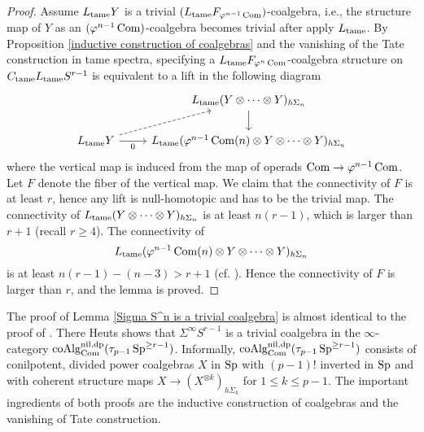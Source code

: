 \begin{proof}
	Assume $L_{\operatorname{\operatorname{tame}}} Y$ is a trivial $(L_{\operatorname{\operatorname{tame}}}F_{\varphi^{n-1} \operatorname{Com}})$-coalgebra, i.e., the structure map of $Y$ as an $(\varphi^{n-1} \operatorname{Com})$-coalgebra becomes trivial after apply $L_{\operatorname{\operatorname{tame}}}$.
	By Proposition \ref{inductive construction of coalgebras} and the vanishing of the Tate construction in tame spectra, specifying a $L_{\operatorname{\operatorname{tame}}}F_{\varphi^{n} \operatorname{Com}}$-coalgebra structure on $C_{\operatorname{\operatorname{tame}}}L_{\operatorname{\operatorname{tame}}}S^{r-1}$ is equivalent to a lift in the following diagram
		\[
	\begin{tikzcd}
		& L_{\tame}(Y \otimes \cdots \otimes Y)_{h\Sigma_n}\\
		 L_{\tame}Y & L_{\tame}(\varphi^{n-1}\Com(n)\otimes Y \otimes \cdots \otimes Y)_{h\Sigma_n}
		\arrow[from = 2-1, to = 1-2, dashed]
		\arrow[from = 2-1, to = 2-2, "0" below]
		\arrow[from = 1-2, to = 2-2]
	\end{tikzcd}
	\]
	where the vertical map is induced from the map of operads $\operatorname{Com}\to \varphi^{n-1}\operatorname{Com}$.
	Let $F$ denote the fiber of the vertical map. We claim that the connectivity of $F$ is at least $r$, hence any lift is null-homotopic and has to be the trivial map.
	The connectivity of $L_{\operatorname{\operatorname{tame}}}(Y \otimes \cdots \otimes Y)_{h\Sigma_n}$ is at least $n(r-1)$, which is larger than $r+1$ (recall $r\geq 4$). 
    The connectivity of 
	$$
    L_{\operatorname{\operatorname{tame}}}(\varphi^{n-1}\operatorname{Com}(n)\otimes Y \otimes \cdots \otimes Y)_{h\Sigma_n}
	$$
	is at least $n(r-1)-(n-3) > r+1$ (cf. \cite[Proposition 4.10 and Example 4.7]{Heuts_Goodwillie}). Hence the connectivity of $F$ is larger than $r$, and the lemma is proved.
	
\end{proof}

\begin{remark}
	The proof of Lemma \ref{Sigma S^n is a trivial coalgebra} is almost identical to the proof of \cite[Lemma 6.17]{Heuts_Goodwillie}. 
	There Heuts shows that $\Sigma^{\infty}S^{r-1}$ is a trivial coalgebra in the $\infty$-category $\operatorname{coAlg}^{\operatorname{nil}, \operatorname{dp}}_{\operatorname{Com}}(\tau_{p-1}\operatorname{Sp}^{\geq r-1})$.
	Informally, $\operatorname{coAlg}^{\operatorname{nil}, \operatorname{dp}}_{\operatorname{Com}}(\tau_{p-1}\operatorname{Sp}^{\geq r-1})$ consists of conilpotent, divided power coalgebras $X$ in $\operatorname{Sp}$ with $(p-1)!$ inverted in $\operatorname{Sp}$ and with coherent structure maps $X\to (X^{\otimes k})_{h\Sigma_k}$ for $1\leq k \leq p-1$. 
	The important ingredients of both proofs are the inductive construction of coalgebras and the vanishing of Tate construction.
\end{remark}


